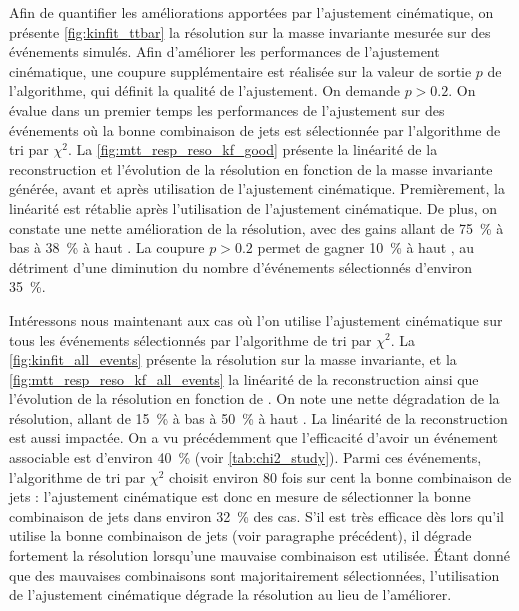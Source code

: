 Afin de quantifier les améliorations apportées par l'ajustement cinématique, on présente \cref{fig:kinfit_ttbar} la résolution sur la masse invariante mesurée sur des événements \ttbar simulés. Afin d'améliorer les performances de l'ajustement cinématique, une coupure supplémentaire est réalisée sur la valeur de sortie $p$ de l'algorithme, qui définit la qualité de l'ajustement. On demande $p > \num{0.2}$. On évalue dans un premier temps les performances de l'ajustement sur des événements où la bonne combinaison de jets est sélectionnée par l'algorithme de tri par $\chi^2$. La \cref{fig:mtt_resp_reso_kf_good} présente la linéarité de la reconstruction et l'évolution de la résolution en fonction de la masse invariante \ttbar générée, avant et après utilisation de l'ajustement cinématique. Premièrement, la linéarité est rétablie après l'utilisation de l'ajustement cinématique. De plus, on constate une nette amélioration de la résolution, avec des gains allant de \tilde\SI{75}{\%} à bas \mtt à \tilde\SI{38}{\%} à haut \mtt. La coupure $p > \num{0.2}$ permet de gagner \tilde\SI{10}{\%} à haut \mtt, au détriment d'une diminution du nombre d'événements sélectionnés d'environ \SI{35}{\%}.

Intéressons nous maintenant aux cas où l'on utilise l'ajustement cinématique sur tous les événements sélectionnés par l'algorithme de tri par $\chi^2$. La \cref{fig:kinfit_all_events} présente la résolution sur la masse invariante, et la \cref{fig:mtt_resp_reso_kf_all_events} la linéarité de la reconstruction ainsi que l'évolution de la résolution en fonction de \mttgen. On note une nette dégradation de la résolution, allant de \tilde\SI{15}{\%} à bas \mtt à \tilde\SI{50}{\%} à haut \mtt. La linéarité de la reconstruction est aussi impactée. On a vu précédemment que l'efficacité d'avoir un événement associable est d'environ \SI{40}{\%} (voir \cref{tab:chi2_study}). Parmi ces événements, l'algorithme de tri par $\chi^2$ choisit environ \num{80} fois sur cent la bonne combinaison de jets : l'ajustement cinématique est donc en mesure de sélectionner la bonne combinaison de jets dans environ \SI{32}{\%} des cas. S'il est très efficace dès lors qu'il utilise la bonne combinaison de jets (voir paragraphe précédent), il dégrade fortement la résolution lorsqu'une mauvaise combinaison est utilisée. Étant donné que des mauvaises combinaisons sont majoritairement sélectionnées, l'utilisation de l'ajustement cinématique dégrade la résolution au lieu de l'améliorer.

\bigskip

